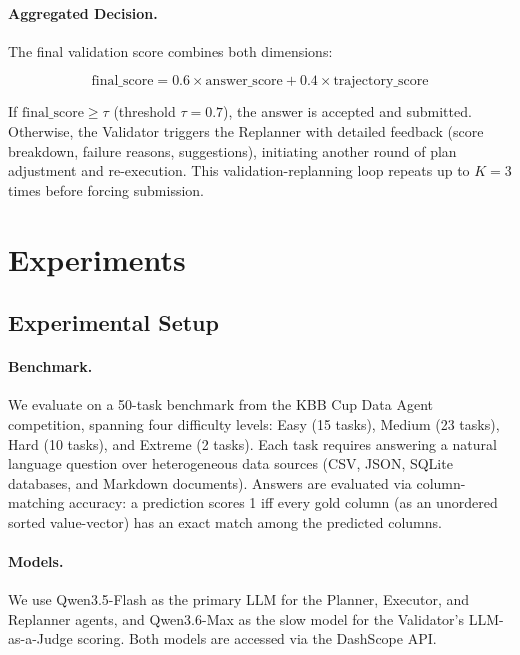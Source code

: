 \documentclass{article}
\begin{document}
\paragraph{Aggregated Decision.}
The final validation score combines both dimensions:

\[
\text{final\_score} = 0.6 \times \text{answer\_score} + 0.4 \times \text{trajectory\_score}
\]

If $\text{final\_score} \geq \tau$ (threshold $\tau = 0.7$), the answer is accepted and submitted.
Otherwise, the Validator triggers the Replanner with detailed feedback (score breakdown, failure reasons, suggestions), initiating another round of plan adjustment and re-execution.
This validation-replanning loop repeats up to $K=3$ times before forcing submission.


\section{Experiments}

\subsection{Experimental Setup}

\paragraph{Benchmark.}
We evaluate on a 50-task benchmark from the KBB Cup Data Agent competition, spanning four difficulty levels: Easy (15 tasks), Medium (23 tasks), Hard (10 tasks), and Extreme (2 tasks).
Each task requires answering a natural language question over heterogeneous data sources (CSV, JSON, SQLite databases, and Markdown documents).
Answers are evaluated via column-matching accuracy: a prediction scores 1 iff every gold column (as an unordered sorted value-vector) has an exact match among the predicted columns.

\paragraph{Models.}
We use Qwen3.5-Flash as the primary LLM for the Planner, Executor, and Replanner agents, and Qwen3.6-Max as the slow model for the Validator's LLM-as-a-Judge scoring.
Both models are accessed via the DashScope API.
\end{document}
